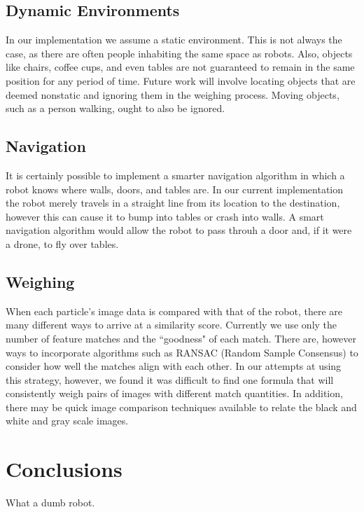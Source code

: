 \documentclass[a4paper,11pt]{article}
\begin{document}
\subsection{Dynamic Environments}
In our implementation we assume a static environment. This is not always the case, as there are often people inhabiting the same space as robots. Also, objects like chairs, coffee cups, and even tables are not guaranteed to remain in the same position for any period of time. Future work will involve locating objects that are deemed nonstatic and ignoring them in the weighing process. Moving objects, such as a person walking, ought to also be ignored.

\subsection{Navigation}
It is certainly possible to implement a smarter navigation algorithm in which a robot knows where walls, doors, and tables are. In our current implementation the robot merely travels in a straight line from its location to the destination, however this can cause it to bump into tables or crash into walls. A smart navigation algorithm would allow the robot to pass throuh a door and, if it were a drone, to fly over tables.

\subsection{Weighing}
When each particle's image data is compared with that of the robot, there are many different ways to arrive at a similarity score. Currently we use only the number of feature matches and the ``goodness" of each match. There are, however ways to incorporate algorithms such as RANSAC (Random Sample Consensus) to consider how well the matches align with each other. In our attempts at using this strategy, however, we found it was difficult to find one formula that will consistently weigh pairs of images with different match quantities. In addition, there may be quick image comparison techniques available to relate the black and white and gray scale images.

\section{Conclusions}
What a dumb robot.








  
\end{document}
